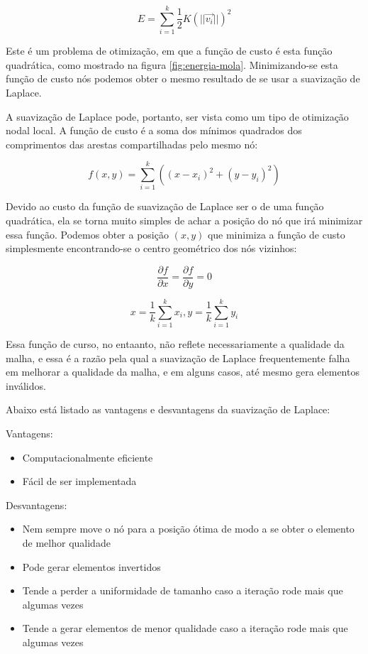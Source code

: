 \begin{equation*}
    E = \sum_{i=1}^k \frac{1}{2} K (||\vec{v_i}||)^2
\end{equation*}

Este é um problema de otimização, em que a função de custo é esta função quadrática, como mostrado na figura \ref{fig:energia-mola}. Minimizando-se esta função de custo nós podemos obter o mesmo resultado de se usar a suavização de Laplace.

A suavização de Laplace pode, portanto, ser vista como um tipo de otimização nodal local. A função de custo é a soma dos mínimos quadrados dos comprimentos das arestas compartilhadas pelo mesmo nó:

\begin{equation*}
    f(x,y) = \sum_{i=1}^k ((x-x_i)^2 + (y-y_i)^2)
\end{equation*}

Devido ao custo da função de suavização de Laplace ser o de uma função quadrática, ela se torna muito simples de achar a posição do nó que irá minimizar essa função. Podemos obter a posição $(x,y)$ que minimiza a função de custo simplesmente encontrando-se o centro geométrico dos nós vizinhos:

\begin{equation*}
    \frac{\partial f}{\partial x} = \frac{\partial f}{\partial y} = 0
\end{equation*}

\begin{equation*}
    x = \frac{1}{k} \sum_{i=1}^k x_i, y = \frac{1}{k} \sum_{i=1}^k y_i
\end{equation*}

Essa função de curso, no entaanto, não reflete necessariamente a qualidade da malha, e essa é a razão pela qual a suavização de Laplace frequentemente falha em melhorar a qualidade da malha, e em alguns casos, até mesmo gera elementos inválidos.

Abaixo está listado as vantagens e desvantagens da suavização de Laplace:

Vantagens:
\begin{itemize}
    \item Computacionalmente eficiente
    \item Fácil de ser implementada
\end{itemize}

Desvantagens:
\begin{itemize}
    \item Nem sempre move o nó para a posição ótima de modo a se obter o elemento de melhor qualidade
    \item Pode gerar elementos invertidos
    \item Tende a perder a uniformidade de tamanho caso a iteração rode mais que algumas vezes
    \item Tende a gerar elementos de menor qualidade caso a iteração rode mais que algumas vezes
\end{itemize}

